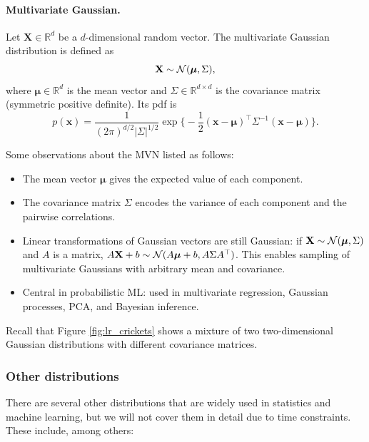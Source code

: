 \paragraph{Multivariate Gaussian.}
Let $\mathbf{X} \in \mathbb{R}^d$ be a $d$-dimensional random vector. The multivariate Gaussian distribution is defined as
\begin{equation}
	\mathbf{X} \sim {\mathcal N}(\boldsymbol{\mu}, \Sigma),
\end{equation}
where $\boldsymbol{\mu} \in \mathbb{R}^d$ is the mean vector and $\Sigma \in \mathbb{R}^{d\times d}$ is the covariance matrix (symmetric positive definite). Its pdf is
\begin{equation}
	p(\mathbf{x}) = \frac{1}{(2\pi)^{d/2}|\Sigma|^{1/2}} 
	                 \exp\Biggl\{-\frac{1}{2}(\mathbf{x}-\boldsymbol{\mu})^\top \Sigma^{-1} (\mathbf{x}-\boldsymbol{\mu}) \Biggr\}.
\end{equation}

Some observations about the MVN listed as follows: 
\begin{itemize}
	\item The mean vector $\boldsymbol{\mu}$ gives the expected value of each component.
	\item The covariance matrix $\Sigma$ encodes the variance of each component and the pairwise correlations.
	\item Linear transformations of Gaussian vectors are still Gaussian: if $\mathbf{X} \sim {\mathcal N}(\boldsymbol{\mu},\Sigma)$ and $A$ is a matrix, $A\mathbf{X} + b \sim {\mathcal N}(A\boldsymbol{\mu}+b, A \Sigma A^\top)$. This enables sampling of multivariate Gaussians with arbitrary mean and covariance.
	\item Central in probabilistic ML: used in multivariate regression, Gaussian processes, PCA, and Bayesian inference.
\end{itemize}

Recall that Figure \ref{fig:lr_crickets} shows a mixture of two two-dimensional Gaussian distributions with different covariance matrices.


\subsubsection{Other distributions}
\label{cap:prob_otherdist}

There are several other distributions that are widely used in statistics and machine learning, but we will not cover them in detail due to time constraints. These include, among others:


